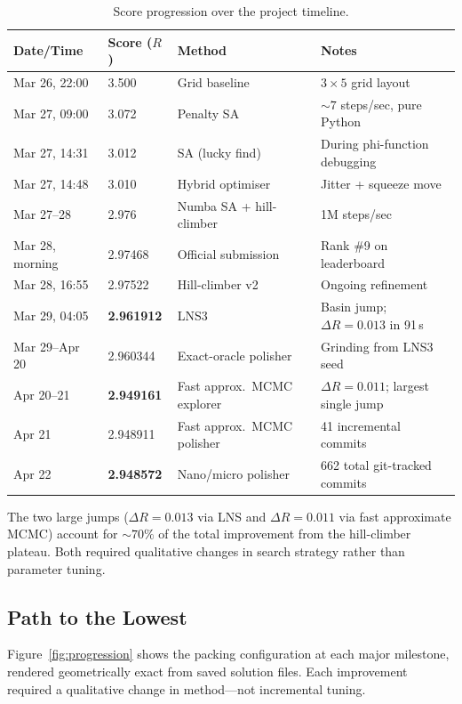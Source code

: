 \documentclass[11pt]{article}
\begin{document}
\begin{table}[t]
\centering
\caption{Score progression over the project timeline.}
\label{tab:progression}
\begin{tabular}{@{}llll@{}}
\toprule
Date/Time & Score ($R$) & Method & Notes \\
\midrule
Mar 26, 22:00 & 3.500     & Grid baseline          & $3\times5$ grid layout \\
Mar 27, 09:00 & 3.072     & Penalty SA             & ${\sim}7$ steps/sec, pure Python \\
Mar 27, 14:31 & 3.012     & SA (lucky find)        & During phi-function debugging \\
Mar 27, 14:48 & 3.010     & Hybrid optimiser       & Jitter + squeeze move \\
Mar 27--28    & 2.976     & Numba SA + hill-climber & 1M steps/sec \\
Mar 28, morning & 2.97468 & Official submission    & Rank \#9 on leaderboard \\
Mar 28, 16:55 & 2.97522   & Hill-climber v2        & Ongoing refinement \\
Mar 29, 04:05 & \textbf{2.961912} & LNS3 & Basin jump; $\Delta R = 0.013$ in 91\,s \\
Mar 29--Apr 20 & 2.960344 & Exact-oracle polisher  & Grinding from LNS3 seed \\
Apr 20--21   & \textbf{2.949161} & Fast approx.\ MCMC explorer & $\Delta R = 0.011$; largest single jump \\
Apr 21       & 2.948911 & Fast approx.\ MCMC polisher & 41 incremental commits \\
Apr 22       & \textbf{2.948572} & Nano/micro polisher & 662 total git-tracked commits \\
\bottomrule
\end{tabular}
\end{table}

The two large jumps ($\Delta R = 0.013$ via LNS and $\Delta R = 0.011$ via fast approximate MCMC) account for ${\sim}70\%$ of the total improvement from the hill-climber plateau.
Both required qualitative changes in search strategy rather than parameter tuning.

\subsection{Path to the Lowest}
\label{sec:path}

Figure~\ref{fig:progression} shows the packing configuration at each major milestone, rendered geometrically exact from saved solution files.
Each improvement required a qualitative change in method---not incremental tuning.
\end{document}

